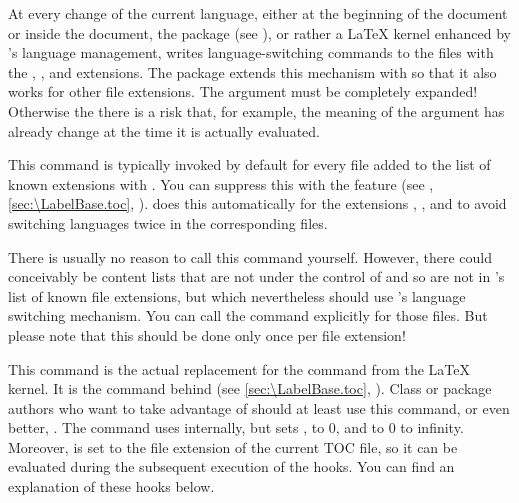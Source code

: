 \begin{Declaration}
\end{Declaration}
At every change of the current language, either at the beginning of the
document or inside the document, the 
package (see \cite{package:babel}), or rather a \LaTeX{} kernel enhanced by
's language management, writes language-switching commands to
the files with the , , and  extensions. The
 package extends this mechanism with
 so that it also works for other file extensions.
The  argument must be completely expanded! Otherwise the
there is a risk that, for example, the meaning of the argument has already
change at the time it is actually evaluated.

This command is typically invoked by default for every file 
added to the list of known extensions with
. You can suppress this with the
 feature (see
, \autoref{sec:\LabelBase.toc},
).  does this
automatically for the extensions , , and  to
avoid switching languages twice in the corresponding files.

There is usually no reason to call this command yourself. However, there could
conceivably be content lists that are not under the control of
 and so are not in 's list of known file
extensions, but which nevertheless should use 's language
switching mechanism. You can call the command explicitly for those files.
But please note that this should be done only once per
file extension!%
\EndIndexGroup


\begin{Declaration}
\end{Declaration}
This command is the actual replacement for the
 command
from the \LaTeX{} kernel. It is the command behind
 (see \autoref{sec:\LabelBase.toc},
). Class or package authors who want to
take advantage of  should at least use this command, or even
better, . The command uses
\Macro{\@starttoc} internally, but sets
,
 to 0, and  to 0
to infinity. Moreover,
 is set to the
file extension of the current TOC file, so it can be evaluated during the
subsequent execution of the hooks. You can find an explanation of these hooks
below.


